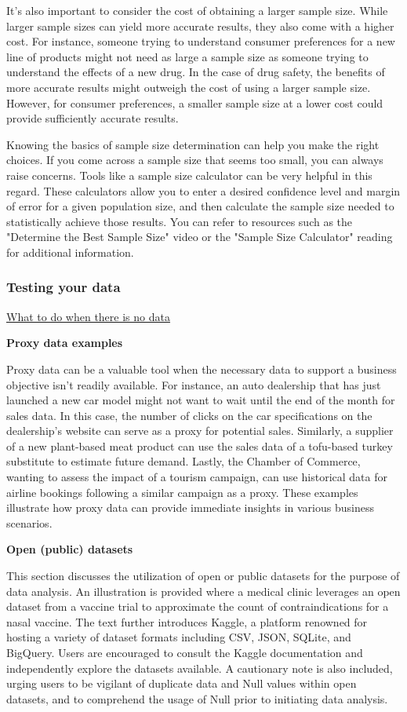 \documentclass[]{article}
\begin{document}
It's also important to consider the cost of obtaining a larger sample size. While larger sample sizes can yield more accurate results, they also come with a higher cost. For instance, someone trying to understand consumer preferences for a new line of products might not need as large a sample size as someone trying to understand the effects of a new drug. In the case of drug safety, the benefits of more accurate results might outweigh the cost of using a larger sample size. However, for consumer preferences, a smaller sample size at a lower cost could provide sufficiently accurate results.

Knowing the basics of sample size determination can help you make the right choices. If you come across a sample size that seems too small, you can always raise concerns. Tools like a sample size calculator can be very helpful in this regard. These calculators allow you to enter a desired confidence level and margin of error for a given population size, and then calculate the sample size needed to statistically achieve those results. You can refer to resources such as the "Determine the Best Sample Size" video or the "Sample Size Calculator" reading for additional information.


\subsubsection{Testing your data}
\uline{What to do when there is no data} \par

\textbf{Proxy data examples}

Proxy data can be a valuable tool when the necessary data to support a business objective isn't readily available. For instance, an auto dealership that has just launched a new car model might not want to wait until the end of the month for sales data. In this case, the number of clicks on the car specifications on the dealership's website can serve as a proxy for potential sales. Similarly, a supplier of a new plant-based meat product can use the sales data of a tofu-based turkey substitute to estimate future demand. Lastly, the Chamber of Commerce, wanting to assess the impact of a tourism campaign, can use historical data for airline bookings following a similar campaign as a proxy. These examples illustrate how proxy data can provide immediate insights in various business scenarios.

\textbf{Open (public) datasets}

This section discusses the utilization of open or public datasets for the purpose of data analysis. An illustration is provided where a medical clinic leverages an open dataset from a vaccine trial to approximate the count of contraindications for a nasal vaccine. The text further introduces Kaggle, a platform renowned for hosting a variety of dataset formats including CSV, JSON, SQLite, and BigQuery. Users are encouraged to consult the Kaggle documentation and independently explore the datasets available. A cautionary note is also included, urging users to be vigilant of duplicate data and Null values within open datasets, and to comprehend the usage of Null prior to initiating data analysis.
\end{document}

